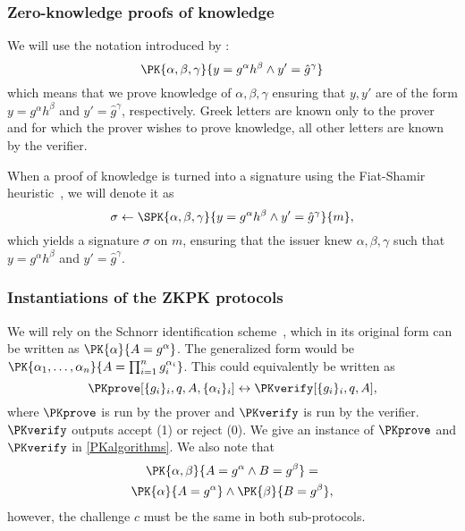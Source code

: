 \subsubsection{Zero-knowledge proofs of knowledge}%
\label{ZKPK}

We will use the notation introduced by \citet{PKnotation}:
\begin{equation}\label{PKexample}
  \PK{\alpha, \beta, \gamma}
  {y = g^\alpha h^\beta \land y' = \hat g^\gamma}
\end{equation}
which means that we prove knowledge of \(\alpha, \beta, \gamma\) ensuring that 
\(y, y'\) are of the form \(y = g^\alpha h^\beta\) and \(y' = \hat g^\gamma\), 
respectively.
Greek letters are known only to the prover and for which the prover wishes to 
prove knowledge, all other letters are known by the verifier.

When a proof of knowledge is turned into a signature using the Fiat-Shamir 
heuristic~\cite{FiatShamirHeuristic}, we will denote it as
\begin{equation*}\label{SPKexample}
  \sigma\gets \SPK{\alpha, \beta, \gamma}
  {y = g^\alpha h^\beta \land y' = \hat g^\gamma}
  {m},
\end{equation*}
which yields a signature \(\sigma\) on \(m\), ensuring that the issuer knew 
\(\alpha, \beta, \gamma\) such that \(y = g^\alpha h^\beta\) and \(y' = 
  \hat{g}^\gamma\).


\subsubsection{Instantiations of the \acs{ZKPK} protocols}


We will rely on the Schnorr identification scheme~\cite{Schnorr}, which in its 
original form can be written as \(\PK{\alpha}{A = g^\alpha}\).
The generalized form would be \(\PK{\alpha_1, \dotsc, \alpha_n}{A = 
    \prod_{i=1}^n g_i^{\alpha_i}}\).
This could equivalently be written as
\begin{equation*}
  \PKprove[\{g_i\}_i, q, A, \{\alpha_i\}_i] \leftrightarrow
  \PKverify[\{g_i\}_i, q, A],
\end{equation*}
where \(\PKprove\) is run by the prover and \(\PKverify\) is run by the 
verifier.
\(\PKverify\) outputs accept (1) or reject (0).
We give an instance of \(\PKprove\) and \(\PKverify\) in \cref{PKalgorithms}.
We also note that
\begin{multline*}
  \PK{\alpha, \beta}{A = g^\alpha \land B = g^\beta} = \\
  \PK{\alpha}{A = g^\alpha} \land \PK{\beta}{B = g^\beta},
\end{multline*}
however, the challenge \(c\) must be the same in both sub-protocols.

